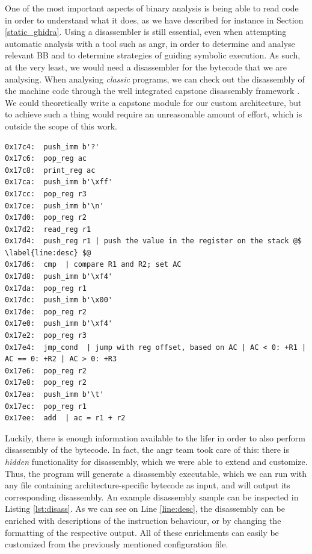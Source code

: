 One of the most important aspects of binary analysis is being able to read code in order to understand what it does, as we have described for instance in Section \ref{static_ghidra}. Using a disassembler is still essential, even when attempting automatic analysis with a tool such as angr, in order to determine and analyse relevant \gls{BB} and to determine strategies of guiding symbolic execution. As such, at the very least, we would need a disassembler for the bytecode that we are analysing. When analysing \emph{classic} programs, we can check out the disassembly of the machine code through the well integrated capstone disassembly framework \cite{capstone}. We could theoretically write a capstone module for our custom architecture, but to achieve such a thing would require an unreasonable amount of effort, which is outside the scope of this work.

\begin{lstlisting}[label={lst:disass}, caption={Disassembly from a section of bytecode extracted from the \cc{vmcastle} sample. The disassembler itself is generated with the \cc{arch-genesis} tool.}]
0x17c4:  push_imm b'?'
0x17c6:  pop_reg ac
0x17c8:  print_reg ac
0x17ca:  push_imm b'\xff'
0x17cc:  pop_reg r3
0x17ce:  push_imm b'\n'
0x17d0:  pop_reg r2
0x17d2:  read_reg r1
0x17d4:  push_reg r1 | push the value in the register on the stack @$ \label{line:desc} $@
0x17d6:  cmp  | compare R1 and R2; set AC
0x17d8:  push_imm b'\xf4'
0x17da:  pop_reg r1
0x17dc:  push_imm b'\x00'
0x17de:  pop_reg r2
0x17e0:  push_imm b'\xf4'
0x17e2:  pop_reg r3
0x17e4:  jmp_cond  | jump with reg offset, based on AC | AC < 0: +R1 | AC == 0: +R2 | AC > 0: +R3
0x17e6:  pop_reg r2
0x17e8:  pop_reg r2
0x17ea:  push_imm b'\t'
0x17ec:  pop_reg r1
0x17ee:  add  | ac = r1 + r2
\end{lstlisting}

Luckily, there is enough information available to the lifer in order to also perform disassembly of the bytecode. In fact, the angr team took care of this: there is \emph{hidden} functionality for disassembly, which we were able to extend and customize. Thus, the  program will generate a disassembly executable, which we can run with any file containing architecture-specific bytecode as input, and will output its corresponding disassembly. An example disassembly sample can be inspected in Listing \ref{lst:disass}. As we can see on Line \ref{line:desc}, the disassembly can be enriched with descriptions of the instruction behaviour, or by changing the formatting of the respective output. All of these enrichments can easily be customized from the previously mentioned  configuration file.

